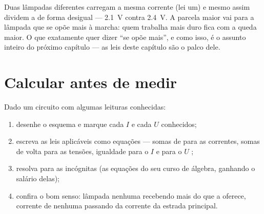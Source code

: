 \begin{example}\label{ex:g8:circuit-laws:unequal}
Duas lâmpadas diferentes  carregam a mesma corrente (lei um)
e mesmo assim dividem a  de forma desigual --- \qty{2.1}{V}
contra \qty{2.4}{V}. A parcela maior vai para a lâmpada que se opõe
mais à marcha: quem trabalha mais duro fica com a queda maior. O que
exatamente quer dizer ``se opõe mais'', e como  isso, é o
assunto inteiro do próximo capítulo --- as leis deste capítulo são o
palco dele.
\end{example}

\section{Calcular antes de medir}

\begin{method}\label{met:g8:circuit-laws:solve}
Dado um circuito com algumas leituras conhecidas:
\begin{enumerate}
  \item desenhe o esquema e marque cada $I$ e cada $U$ conhecidos;
  \item escreva as leis aplicáveis como equações --- somas de  para
        as correntes, somas de volta para as tensões, igualdade para
        o $I$  e para o $U$ ;
  \item resolva para as incógnitas (as equações do seu curso de
        álgebra, ganhando o salário delas);
  \item confira o bom senso: lâmpada nenhuma recebendo mais do que a
         oferece, corrente de  nenhuma passando da corrente
        da estrada principal.
\end{enumerate}
\end{method}

